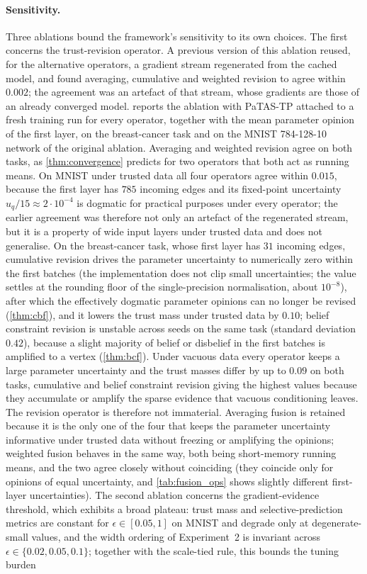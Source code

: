 \paragraph*{Sensitivity.}
Three ablations bound the framework's sensitivity to its own choices. The first concerns the trust-revision operator. A previous version of this ablation reused, for the alternative operators, a gradient stream regenerated from the cached model, and found averaging, cumulative and weighted revision to agree within $0.002$; the agreement was an artefact of that stream, whose gradients are those of an already converged model.  reports the ablation with \ac{PaTAS-TP} attached to a fresh training run for every operator, together with the mean parameter opinion of the first layer, on the breast-cancer task and on the MNIST 784-128-10 network of the original ablation. Averaging and weighted revision agree on both tasks, as \cref{thm:convergence} predicts for two operators that both act as running means. On MNIST under trusted data all four operators agree within $0.015$, because the first layer has $785$ incoming edges and its fixed-point uncertainty $u_q/15 \approx 2 \cdot 10^{-4}$ is dogmatic for practical purposes under every operator; the earlier agreement was therefore not only an artefact of the regenerated stream, but it is a property of wide input layers under trusted data and does not generalise. On the breast-cancer task, whose first layer has $31$ incoming edges, cumulative revision drives the parameter uncertainty to numerically zero within the first batches (the implementation does not clip small uncertainties; the value settles at the rounding floor of the single-precision normalisation, about $10^{-8}$), after which the effectively dogmatic parameter opinions can no longer be revised (\cref{thm:cbf}), and it lowers the trust mass under trusted data by $0.10$; belief constraint revision is unstable across seeds on the same task (standard deviation $0.42$), because a slight majority of belief or disbelief in the first batches is amplified to a vertex (\cref{thm:bcf}). Under vacuous data every operator keeps a large parameter uncertainty and the trust masses differ by up to $0.09$ on both tasks, cumulative and belief constraint revision giving the highest values because they accumulate or amplify the sparse evidence that vacuous conditioning leaves. The revision operator is therefore not immaterial. Averaging fusion is retained because it is the only one of the four that keeps the parameter uncertainty informative under trusted data without freezing or amplifying the opinions; weighted fusion behaves in the same way, both being short-memory running means, and the two agree closely without coinciding (they coincide only for opinions of equal uncertainty, and \cref{tab:fusion_ops} shows slightly different first-layer uncertainties). The second ablation concerns the gradient-evidence threshold, which exhibits a broad plateau: trust mass and selective-prediction metrics are constant for $\epsilon \in [0.05, 1]$ on MNIST and degrade only at degenerate-small values, and the width ordering of Experiment~2 is invariant across $\epsilon \in \{0.02, 0.05, 0.1\}$; together with the scale-tied rule, this bounds the tuning burden 